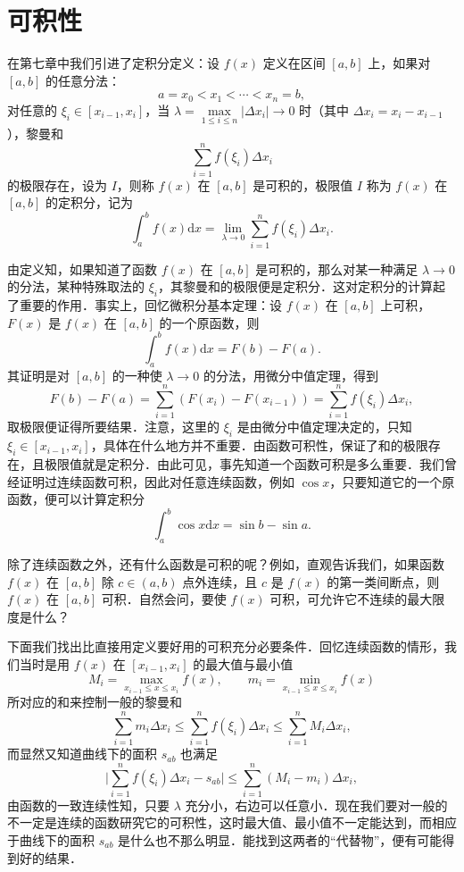 \section{可积性}

在第七章中我们引进了定积分定义：设 $f(x)$ 定义在区间 $[a, b]$ 上，如果对 $[a, b]$ 的任意分法：
\[
a = x_0 < x_1 < \cdots < x_n = b,
\]
对任意的 $\xi_i \in [x_{i-1}, x_i]$，当 $\lambda = \max\limits_{1 \leqslant i \leqslant n} |\Delta x_i| \to 0$ 时（其中 $\Delta x_i = x_i - x_{i-1}$），黎曼和
\[
\sum_{i=1}^{n} f(\xi_i) \Delta x_i
\]
的极限存在，设为 $I$，则称 $f(x)$ 在 $[a, b]$ 是可积的，极限值 $I$ 称为 $f(x)$ 在 $[a, b]$ 的定积分，记为
\[
\int_{a}^{b} f(x) \mathrm{d}x = \lim_{\lambda \to 0} \sum_{i=1}^{n} f(\xi_i) \Delta x_i.
\]

由定义知，如果知道了函数 $f(x)$ 在 $[a, b]$ 是可积的，那么对某一种满足 $\lambda \to 0$ 的分法，某种特殊取法的 $\xi_i$，其黎曼和的极限便是定积分．这对定积分的计算起了重要的作用．事实上，回忆微积分基本定理：设 $f(x)$ 在 $[a, b]$ 上可积，$F(x)$ 是 $f(x)$ 在 $[a, b]$ 的一个原函数，则
\[
\int_{a}^{b} f(x) \mathrm{d}x = F(b) - F(a).
\]
其证明是对 $[a, b]$ 的一种使 $\lambda \to 0$ 的分法，用微分中值定理，得到
\[
F(b) - F(a) = \sum_{i=1}^{n} \left( F(x_i) - F(x_{i-1}) \right) = \sum_{i=1}^{n} f(\xi_i) \Delta x_i,
\]
取极限便证得所要结果．注意，这里的 $\xi_i$ 是由微分中值定理决定的，只知 $\xi_i \in [x_{i-1}, x_i]$，具体在什么地方并不重要．由函数可积性，保证了和的极限存在，且极限值就是定积分．由此可见，事先知道一个函数可积是多么重要．我们曾经证明过连续函数可积，因此对任意连续函数，例如 $\cos x$，只要知道它的一个原函数，便可以计算定积分
\[
\int_{a}^{b} \cos x \mathrm{d}x = \sin b - \sin a.
\]

除了连续函数之外，还有什么函数是可积的呢？例如，直观告诉我们，如果函数 $f(x)$ 在 $[a, b]$ 除 $c \in (a, b)$ 点外连续，且 $c$ 是 $f(x)$ 的第一类间断点，则 $f(x)$ 在 $[a, b]$ 可积．自然会问，要使 $f(x)$ 可积，可允许它不连续的最大限度是什么？

下面我们找出比直接用定义要好用的可积充分必要条件．回忆连续函数的情形，我们当时是用 $f(x)$ 在 $[x_{i-1}, x_i]$ 的最大值与最小值
\[
M_i = \max_{x_{i-1} \leqslant x \leqslant x_i} f(x), \qquad m_i = \min_{x_{i-1} \leqslant x \leqslant x_i} f(x)
\]
所对应的和来控制一般的黎曼和
\[
\sum_{i=1}^{n} m_i \Delta x_i \leqslant \sum_{i=1}^{n} f(\xi_i) \Delta x_i \leqslant \sum_{i=1}^{n} M_i \Delta x_i,
\]
而显然又知道曲线下的面积 $s_{ab}$ 也满足
\[
\bigg| \sum_{i=1}^{n} f(\xi_i) \Delta x_i - s_{ab} \bigg| \leqslant \sum_{i=1}^{n} \left( M_i - m_i \right) \Delta x_i,
\]
由函数的一致连续性知，只要 $\lambda$ 充分小，右边可以任意小．现在我们要对一般的不一定是连续的函数研究它的可积性，这时最大值、最小值不一定能达到，而相应于曲线下的面积 $s_{ab}$ 是什么也不那么明显．能找到这两者的“代替物”，便有可能得到好的结果．

